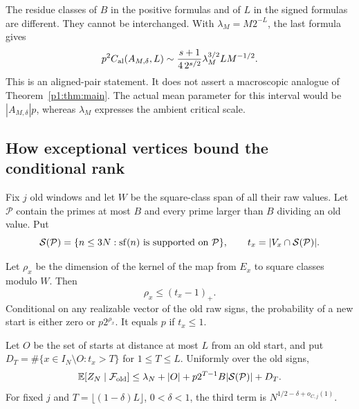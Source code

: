 The residue classes of $B$ in the positive formulas and of
$L$ in the signed formulas are different. They cannot be
interchanged. With $\lambda_M=M2^{-L}$, the last formula gives
\[
 p^2C_{\rm al}(A_{M,\delta},L)
   \sim\frac{s+1}{4\,2^{s/2}}\lambda_M^{3/2}L M^{-1/2}.
\]
This is an aligned-pair statement. It does not assert a
macroscopic analogue of Theorem~\ref{p1:thm:main}. The actual
mean parameter for this interval would be $|A_{M,\delta}|p$,
whereas $\lambda_M$ expresses the ambient critical scale.

\subsection{How exceptional vertices bound the conditional rank}

Fix $j$ old windows and let $W$ be the square-class span of
all their raw values. Let $\mathcal P$ contain the primes at
most $B$ and every prime larger than $B$ dividing an old value.
Put
\[
 \mathcal S(\mathcal P)=\{n\le3N:\sf(n)\text{ is supported on }
                    \mathcal P\},\qquad
 t_x=|V_x\cap\mathcal S(\mathcal P)|.
\]

\begin{lemma}
\label{p1:consequences:conditional-rank}
Let $\rho_x$ be the dimension of the kernel of the map from
$E_x$ to square classes modulo $W$. Then
\[
 \rho_x\le(t_x-1)_+.
\]
Conditional on any realizable vector of the old raw signs,
the probability of a new start is either zero or $p2^{\rho_x}$.
It equals $p$ if $t_x\le1$.

Let $O$ be the set of starts at distance at most $L$ from an
old start, and put
$D_T=\#\{x\in I_N\setminus O:t_x>T\}$ for $1\le T\le L$.
Uniformly over the old signs,
\begin{equation}
 \E[Z_N\mid\mathcal F_{\rm old}]
   \le\lambda_N+|O|+p2^{T-1}B|\mathcal S(\mathcal P)|+D_T.
 \label{p1:consequences:conditional-budget}
\end{equation}
For fixed $j$ and $T=\lfloor(1-\delta)L\rfloor$, $0<\delta<1$,
the third term is $N^{1/2-\delta+o_{C,j}(1)}$.
\end{lemma}

